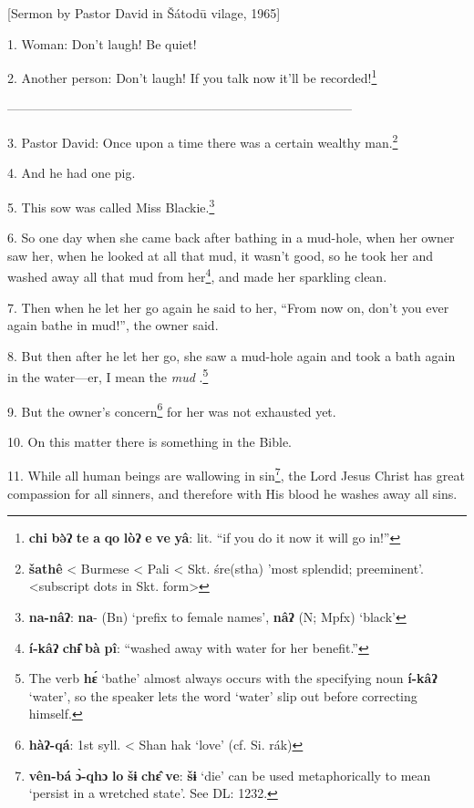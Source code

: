 \setcounter{footnote}{0}

[Sermon by Pastor David in Šátodū vilage, 1965]

1. Woman: Don't laugh! Be quiet!

2. Another person: Don't laugh! If you talk now it'll be recorded!\footnote{\textbf{chi} \textbf{bə̀ʔ} \textbf{te} \textbf{a} \textbf{qo} \textbf{lòʔ} \textbf{e} \textbf{ve} \textbf{yâ}: lit. ``if you do it now it will go in!''}

---------------------------------------------------------------------------------

3. Pastor David: Once upon a time there was a certain wealthy man.\footnote{\textbf{šathê} < Burmese < Pali < Skt. śre(stha) 'most splendid; preeminent'. <subscript dots in Skt. form>}

4. And he had one pig.

5. This sow was called Miss Blackie.\footnote{\textbf{na-nâʔ}: \textbf{na}- (Bn) `prefix to female names', \textbf{nâʔ} (N; Mpfx) `black'}

6. So one day when she came back after bathing in a mud-hole, when her owner saw
her, when he looked at all that mud, it wasn't good, so he took her and washed
away all that mud from her\footnote{\textbf{í-kâʔ} \textbf{chɨ̂} \textbf{bà} \textbf{pî}: ``washed away with water for her benefit.''}, and made her sparkling clean.

7. Then when he let her go again he said to her, ``From now on, don't you ever
again bathe in mud!'', the owner said.

8. But then after he let her go, she saw a mud-hole again and took a bath again
in the water---er, I mean the \textit{mud }.\footnote{The verb \textbf{hɛ́} `bathe' almost always occurs with the specifying noun \textbf{í-kâʔ} `water', so the speaker lets the word `water' slip out before correcting himself.}

9. But the owner's concern\footnote{\textbf{hàʔ-qá}: 1st syll. < Shan hak `love' (cf. Si. rák)} for her was not exhausted yet.

10. On this matter there is something in the Bible.

11. While all human beings are wallowing in sin\footnote{\textbf{vên-bá} \textbf{ɔ̀-qhɔ} \textbf{lo} \textbf{šɨ} \textbf{chɛ̂} \textbf{ve}: \textbf{šɨ} `die' can be used metaphorically to mean `persist in a wretched state'. See DL: 1232.}, the Lord Jesus Christ has
great compassion for all sinners, and therefore with His blood he washes away all
sins.

